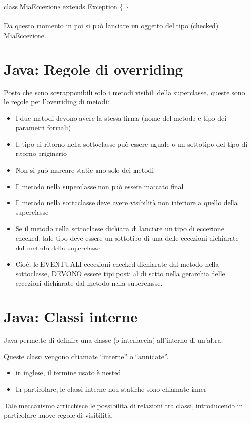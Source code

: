 \documentclass[10pt]{article}
\begin{document}
class MiaEccezione extends Exception \{ \}\\\\
Da questo momento in poi si può lanciare un oggetto del tipo
(checked) MiaEccezione.
\section{Java: Regole di overriding}
Posto che sono sovrapponibili solo i metodi visibili della superclasse,
queste sono le regole per l’overriding di metodi:
\begin{itemize}
    \item I due metodi devono avere la stessa firma (nome del metodo
    e tipo dei parametri formali)
    \item Il tipo di ritorno nella sottoclasse può essere uguale o un
    sottotipo del tipo di ritorno originario
    \item Non si può marcare static uno solo dei metodi
    \item Il metodo nella superclasse non può essere marcato final
    \item Il metodo nella sottoclasse deve avere visibilità non inferiore a
    quello della superclasse
    \item Se il metodo nella sottoclasse dichiara di lanciare un tipo di
    eccezione checked, tale tipo deve essere un sottotipo di una delle
    eccezioni dichiarate dal metodo della superclasse
    \item Cioè, le EVENTUALI eccezioni checked dichiarate dal metodo
    nella sottoclasse, DEVONO essere tipi posti al di sotto nella
    gerarchia delle eccezioni dichiarate dal metodo nella superclasse.
\end{itemize}
\section{Java: Classi interne}
Java permette di definire una classe (o interfaccia) all'interno di un'altra.
 
Queste classi vengono chiamate “interne” o “annidate”.
\begin{itemize}
    \item in inglese, il termine usato è nested
    \item In particolare, le classi interne non statiche sono chiamate inner
\end{itemize}
Tale meccanismo arricchisce le possibilità di relazioni tra classi, introducendo in particolare nuove 
regole di visibilità.
\end{document}
